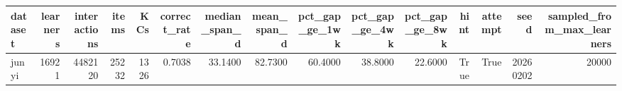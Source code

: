 \begin{tabular}{lrrrrrrrrrrrrrr}
\toprule
dataset & learners & interactions & items & KCs & correct\_rate & median\_span\_d & mean\_span\_d & pct\_gap\_ge\_1wk & pct\_gap\_ge\_4wk & pct\_gap\_ge\_8wk & hint & attempt & seed & sampled\_from\_max\_learners \\
\midrule
junyi & 16921 & 4482120 & 25232 & 1326 & 0.7038 & 33.1400 & 82.7300 & 60.4000 & 38.8000 & 22.6000 & True & True & 20260202 & 20000 \\
\bottomrule
\end{tabular}
